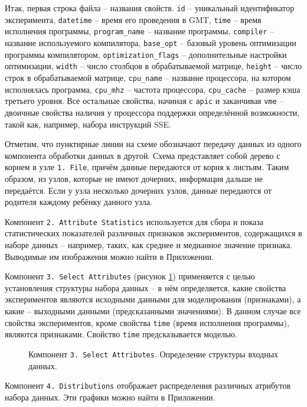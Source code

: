 Итак, первая строка файла -- названия свойств. \texttt{id} -- уникальный идентификатор эксперимента, \texttt{datetime} -- время его проведения в GMT, \texttt{time} -- время исполнения программы, \texttt{program_name} -- название программы, \texttt{compiler} -- название используемого компилятора, \texttt{base_opt} -- базовый уровень оптимизации программы компилятором, \texttt{optimization_flags} -- дополнительные настройки оптимизации, \texttt{width} -- число столбцов в обрабатываемой матрице, \texttt{height} -- число строк в обрабатываемой матрице, \texttt{cpu_name} -- название процессора, на котором исполнялась программа, \texttt{cpu_mhz} -- частота процессора, \texttt{cpu_cache} -- размер кэша третьего уровня. Все остальные свойства, начиная с \texttt{apic} и заканчивая \texttt{vme} -- двоичные свойства наличия у процессора поддержки определённой возможности, такой как, например, набора инструкций SSE.

Отметим, что пунктирные линии на схеме обозначают передачу данных из одного компонента обработки данных в другой. Схема представляет собой дерево с корнем в узле \texttt{1. File}, причём данные передаются от корня к листьям. Таким образом, из узлов, которые не имеют дочерних, информация дальше не передаётся. Если у узла несколько дочерних узлов, данные передаются от родителя каждому ребёнку данного узла.

Компонент \texttt{2. Attribute Statistics} используется для сбора и показа статистических показателей различных признаков экспериментов, содержащихся в наборе данных -- например, таких, как среднее и медианное значение признака. Выводимые им изображения можно найти в Приложении.

Компонент \texttt{3. Select Attributes} (рисунок \ref{img:3-Select-Attributes}) применяется с целью установления структуры набора данных -- в нём определяется, какие свойства экспериментов являются исходными данными для моделирования (признаками), а какие -- выходными данными (предсказанными значениями). В данном случае все свойства экспериментов, кроме свойства \texttt{time} (время исполнения программы), являются признаками. Свойство \texttt{time} предсказывается моделью.

\begin{figure}[H]
    \caption{Компонент \texttt{3. Select Attributes}. Определение структуры входных данных.}
    \label{img:3-Select-Attributes}
\end{figure}

Компонент \texttt{4. Distributions} отображает распределения различных атрибутов набора данных. Эти графики можно найти в Приложении.

